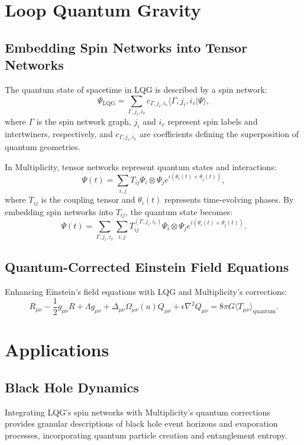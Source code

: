 \documentclass{article}
\theoremstyle{plain}
\begin{document}
\section{Loop Quantum Gravity}
\subsection{Embedding Spin Networks into Tensor Networks}
The quantum state of spacetime in LQG is described by a spin network:
\begin{equation}
\Psi_{\text{LQG}} = \sum_{\Gamma, j_i, i_v} c_{\Gamma, j_i, i_v} \langle \Gamma, j_i, i_v | \Psi \rangle,
\end{equation}
where $\Gamma$ is the spin network graph, $j_i$ and $i_v$ represent spin labels and intertwiners, respectively, and $c_{\Gamma, j_i, i_v}$ are coefficients defining the superposition of quantum geometries.

In Multiplicity, tensor networks represent quantum states and interactions:
\begin{equation}
\Psi(t) = \sum_{i,j} T_{ij} \Psi_i \otimes \Psi_j e^{i(\theta_i(t) + \theta_j(t))},
\end{equation}
where $T_{ij}$ is the coupling tensor and $\theta_i(t)$ represents time-evolving phases. By embedding spin networks into $T_{ij}$, the quantum state becomes:
\begin{equation}
\Psi(t) = \sum_{\Gamma, j_i, i_v} \sum_{i,j} T_{ij}^{(\Gamma, j_i, i_v)} \Psi_i \otimes \Psi_j e^{i(\theta_i(t) + \theta_j(t))}.
\end{equation}

\subsection{Quantum-Corrected Einstein Field Equations}
Enhancing Einstein's field equations with LQG and Multiplicity's corrections:
\begin{equation}
R_{\mu\nu} - \frac{1}{2} g_{\mu\nu} R + \Lambda g_{\mu\nu} + \Delta_{\mu\nu} \Omega_{\mu\nu}(u) Q_{\mu\nu} + \epsilon \nabla^2 Q_{\mu\nu} = 8 \pi G \langle T_{\mu\nu} \rangle_{\text{quantum}}.
\end{equation}

\section{Applications}
\subsection{Black Hole Dynamics}
Integrating LQG's spin networks with Multiplicity's quantum corrections provides granular descriptions of black hole event horizons and evaporation processes, incorporating quantum particle creation and entanglement entropy.
\end{document}
